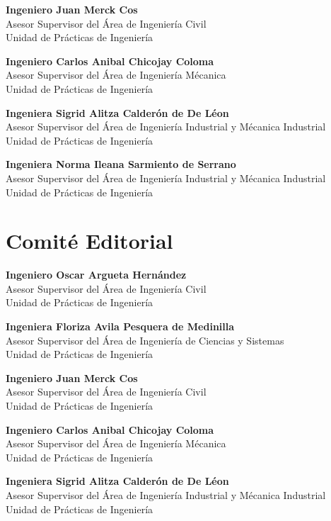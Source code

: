 \documentclass[11pt,spanish,Letterpaper,openany]{book}
\begin{document}
\textbf{Ingeniero Juan Merck Cos}\\
Asesor Supervisor del Área de Ingeniería Civil\\
Unidad de Prácticas de Ingeniería
\bigskip

\textbf{Ingeniero Carlos Anibal Chicojay Coloma}\\
Asesor Supervisor del Área de Ingeniería Mécanica\\
Unidad de Prácticas de Ingeniería
\bigskip

\textbf{Ingeniera Sigrid Alitza Calderón de De Léon}\\
Asesor Supervisor del Área de Ingeniería Industrial y Mécanica Industrial\\
Unidad de Prácticas de Ingeniería
\bigskip

\textbf{Ingeniera Norma Ileana Sarmiento de Serrano}\\
Asesor Supervisor del Área de Ingeniería Industrial y Mécanica Industrial\\
Unidad de Prácticas de Ingeniería

\hypertarget{comite-editorial}{%
\section*{Comité Editorial}\label{comite-editorial}}

\textbf{Ingeniero Oscar Argueta Hernández}\\
Asesor Supervisor del Área de Ingeniería Civil\\
Unidad de Prácticas de Ingeniería
\bigskip

\textbf{Ingeniera Floriza Avila Pesquera de Medinilla}\\
Asesor Supervisor del Área de Ingeniería de Ciencias y Sistemas\\
Unidad de Prácticas de Ingeniería
\bigskip

\textbf{Ingeniero Juan Merck Cos}\\
Asesor Supervisor del Área de Ingeniería Civil\\
Unidad de Prácticas de Ingeniería
\bigskip

\textbf{Ingeniero Carlos Anibal Chicojay Coloma}\\
Asesor Supervisor del Área de Ingeniería Mécanica\\
Unidad de Prácticas de Ingeniería
\bigskip

\textbf{Ingeniera Sigrid Alitza Calderón de De Léon}\\
Asesor Supervisor del Área de Ingeniería Industrial y Mécanica Industrial\\
Unidad de Prácticas de Ingeniería
\bigskip
\end{document}
